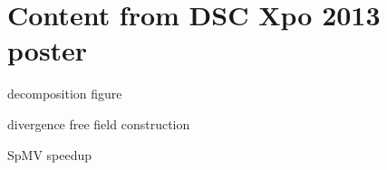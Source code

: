 \chapter{Content from DSC Xpo 2013 poster}


decomposition figure

divergence free field construction

SpMV speedup